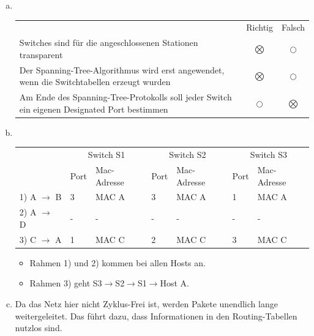 \begin{enumerate}[a)]
	\item {\hfill\\
	\begin{tabular}{p{11.2cm}cc}
											& Richtig     & Falsch \\
	Switches sind für die angeschlossenen Stationen transparent		& $\bigotimes$ & $\bigcirc$ \\
	Der Spanning-Tree-Algorithmus wird erst angewendet, wenn die Switchtabellen erzeugt wurden		& $\bigotimes$   & $\bigcirc$ \\
	Am Ende des Spanning-Tree-Protokolls soll jeder Switch ein eigenen Designated Port bestimmen		& $\bigcirc$   & $\bigotimes$
	\end{tabular}}
	
	\item {\hfill \\ 
	\begin{center}
		\begin{tabular} {l||l|l||l|l||l|l}
			      & \multicolumn{2}{c||}{Switch S1} & \multicolumn{2}{c||}{Switch S2} & \multicolumn{2}{c}{Switch S3} \\
			      & Port & Mac-Adresse & Port & Mac-Adresse & Port & Mac-Adresse \\ \hline
		1) A $\to$ B & 3    & MAC A       & 3	  & MAC A       & 1    & MAC A       \\ \hline
		2) A $\to$ D & -    & -           & -	  & -           & -    & -           \\ \hline
		3) C $\to$ A & 1    & MAC C       & 2	  & MAC C       & 3    & MAC C       \\ 
		\end{tabular}
	\end{center}

	\begin{itemize}
		\item Rahmen 1) und 2) kommen bei allen Hosts an. 
		\item Rahmen 3) geht S3$\to$S2$\to$S1$\to$Host A.
	\end{itemize}
	}
	
	\item Da das Netz hier nicht Zyklus-Frei ist, werden Pakete unendlich lange weitergeleitet. Das führt dazu, dass Informationen in den Routing-Tabellen nutzlos sind. 


\end{enumerate}
